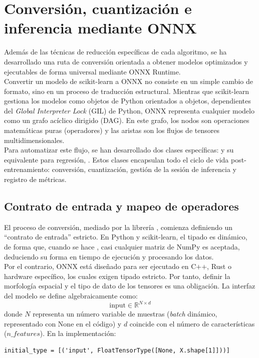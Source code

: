 \documentclass[a4paper,12pt,twoside,final]{book}
\begin{document}
\section{Conversión, cuantización e inferencia mediante ONNX}
Además de las técnicas de reducción específicas de cada algoritmo, se ha desarrollado una ruta de conversión orientada
a obtener modelos optimizados y ejecutables de forma universal mediante ONNX Runtime.\\

Convertir un modelo de scikit-learn a ONNX no consiste en un simple cambio de formato, sino en un proceso de traducción
estructural. Mientras que scikit-learn gestiona los modelos como objetos de Python orientados a objetos, dependientes
del \textit{Global Interpreter Lock} (GIL) de Python, ONNX representa cualquier modelo como un grafo acíclico dirigido
(DAG). En este grafo, los nodos son operaciones matemáticas puras (operadores) y las aristas son los flujos de tensores
multidimensionales.\\

Para automatizar este flujo, se han desarrollado dos clases específicas:  y su
equivalente para regresión, . Estos clases encapsulan todo el ciclo de vida
post-entrenamiento: conversión, cuantización, gestión de la sesión de inferencia y registro de métricas.

\subsection{Contrato de entrada y mapeo de operadores}
El proceso de conversión, mediado por la librería , comienza definiendo un ``contrato de entrada''
estricto. En Python y scikit-learn, el tipado es dinámico, de forma que, cuando se hace , casi
cualquier matriz de NumPy es aceptada, deduciendo su forma en tiempo de ejecución y procesando los datos.\\

Por el contrario, ONNX está diseñado para ser ejecutado en C$+$$+$, Rust o hardware específico, los cuales exigen
tipado estricto. Por tanto, definir la morfología espacial y el tipo de dato de los tensores es una obligación. La
interfaz del modelo se define algebraicamente como:
\[
\text{input} \in \mathbb{R}^{N \times d}
\]
donde $N$ representa un número variable de muestras (\textit{batch} dinámico, representado con None en el código) y $d$
coincide con el número de características ($n\_features$). En la implementación:
\begin{verbatim}
initial_type = [('input', FloatTensorType([None, X.shape[1]]))]  
\end{verbatim}
\end{document}
